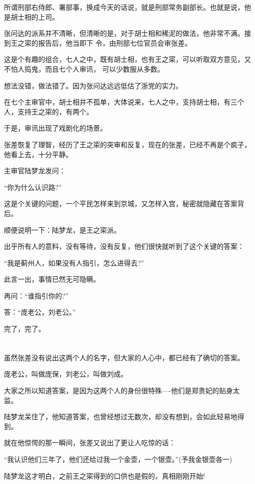 \documentclass[11pt,a4paper,onecolumn]{article}
\begin{document}
所谓刑部右侍郎、署部事，换成今天的话说，就是刑部常务副部长。也就是说，他是胡士相的上司。

张问达的派系并不清晰，但清晰的是，对于胡士相和稀泥的做法，他非常不满。接到王之寀的报告后，他当即下
令，由刑部七位官员会审张差。

这是个有趣的组合，七人之中，既有胡士相，也有王之寀，可以听取双方意见，又不怕人捣鬼，而且七个人审讯，
可以少数服从多数。

想法没错，做法错了。因为张问达远远低估了浙党的实力。

在七个主审官中，胡士相并不孤单，大体说来，七人之中，支持胡士相，有三个人，支持王之寀的，有两个。

于是，审讯出现了戏剧化的场景。

张差恢复了理智，经历了王之寀的突审和反复，现在的张差，已经不再是个疯子，他看上去，十分平静。

主审官陆梦龙发问：

``你为什么认识路?''

这是个关键的问题，一个平民怎样来到京城，又怎样入宫，秘密就隐藏在答案背后。

顺便说明一下：陆梦龙，是王之寀派。

出乎所有人的意料，没有等待，没有反复，他们很快就听到了这个关键的答案：

``我是蓟州人，如果没有人指引，怎么进得去?''

此言一出，事情已然无可隐瞒。

再问：``谁指引你的?''

答：``庞老公，刘老公。''

完了，完了。

\section[\thesection]{}

虽然张差没有说出这两个人的名字，但大家的人心中，都已经有了确切的答案。

庞老公，叫做庞保，刘老公，叫做刘成。

大家之所以知道答案，是因为这两个人的身份很特殊----他们是郑贵妃的贴身太监。

陆梦龙呆住了，他知道答案，也曾经想过无数次，却没有想到，会如此轻易地得到。

就在他惊愕的那一瞬间，张差又说出了更让人吃惊的话：

``我认识他们三年了，他们还给过我一个金壶，一个银壶。''(予我金银壶各一)

陆梦龙这才明白，之前王之寀得到的口供也是假的，真相刚刚开始!
\end{document}
